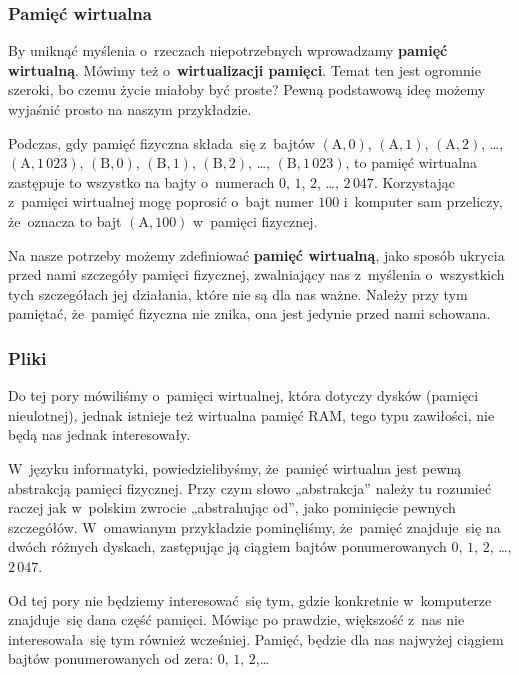 \documentclass[10pt,t]{beamer}
\begin{document}
\begin{frame}
  \frametitle{Pamięć wirtualna}


  By uniknąć myślenia o~rzeczach niepotrzebnych wprowadzamy
  \textbf{pamięć wirtualną}. Mówimy też o~\textbf{wirtualizacji pamięci}.
  Temat ten jest ogromnie szeroki, bo czemu życie miałoby być proste? Pewną
  podstawową ideę możemy wyjaśnić prosto na naszym przykładzie.

  Podczas, gdy pamięć fizyczna składa~się z~bajtów $( \text{A}, 0 )$,
  $( \text{A}, 1 )$, $( \text{A}, 2 )$, \ldots, $( \text{A}, 1 \, 023 )$,
  $( \text{B}, 0 )$, $( \text{B}, 1 )$, $( \text{B}, 2 )$, \ldots,
  $( \text{B}, 1 \, 023)$, to pamięć wirtualna zastępuje to wszystko
  na bajty o~numerach $0$, $1$, $2$, \ldots, $2 \, 047$. Korzystając z~pamięci
  wirtualnej mogę poprosić o~bajt numer $100$ i~komputer sam przeliczy,
  że~oznacza to bajt $( \text{A}, 100 )$ w~pamięci fizycznej.

  Na nasze potrzeby możemy zdefiniować \textbf{pamięć wirtualną}, jako
  sposób ukrycia przed nami szczegóły pamięci fizycznej, zwalniający nas
  z~myślenia o~wszystkich tych szczegółach jej działania, które nie są
  dla nas ważne. Należy przy tym pamiętać, że~pamięć fizyczna nie znika,
  ona jest jedynie przed nami schowana.

\end{frame}





\begin{frame}
  \frametitle{Pliki}


  Do tej pory mówiliśmy o~pamięci wirtualnej, która dotyczy dysków
  (pamięci nieulotnej), jednak istnieje też wirtualna pamięć RAM, tego
  typu zawiłości, nie będą nas jednak interesowały.

  W~języku informatyki, powiedzielibyśmy, że~pamięć wirtualna jest pewną
  abstrakcją pamięci fizycznej. Przy czym słowo „abstrakcja” należy tu
  rozumieć raczej jak w~polskim zwrocie „abstrahując od”, jako pominięcie
  pewnych szczegółów. W~omawianym przykładzie pominęliśmy, że~pamięć
  znajduje~się na dwóch różnych dyskach, zastępując ją ciągiem bajtów
  ponumerowanych $0$, $1$, $2$, \ldots, $2 \, 047$.

  Od tej pory nie będziemy interesować~się tym, gdzie konkretnie
  w~komputerze znajduje~się dana część pamięci. Mówiąc po prawdzie,
  większość z~nas nie interesowała~się tym również wcześniej. Pamięć,
  będzie dla nas najwyżej ciągiem bajtów ponumerowanych od zera:
  $0$, $1$, $2$,\ldots



\end{frame}
\end{document}
